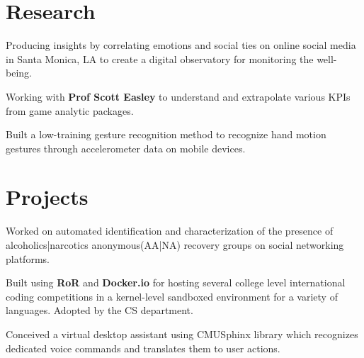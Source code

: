 \documentclass[]{deedy-resume-openfont}
\begin{document}
\begin{minipage}[t]{0.66\textwidth}


\section{Research}
Producing insights by correlating emotions and social ties on online social media in Santa Monica, LA to create a digital observatory for monitoring the well-being.
\sectionsep

Working with \textbf{Prof Scott Easley} to understand and extrapolate various KPIs from game analytic packages.
\sectionsep


Built a low-training gesture recognition method to recognize hand motion gestures through accelerometer data on mobile devices.

\section{Projects}
Worked on automated identification and characterization of the presence of alcoholics|narcotics anonymous(AA|NA) recovery groups on social networking platforms.
\sectionsep

Built using \textbf{RoR} and \textbf{Docker.io} for hosting several college level international coding competitions in a kernel-level sandboxed environment for a variety of languages. Adopted by the CS department.
\sectionsep

Conceived a virtual desktop assistant using CMUSphinx library which recognizes dedicated voice commands and translates them to user actions.
\sectionsep




\end{minipage}
\end{document}
